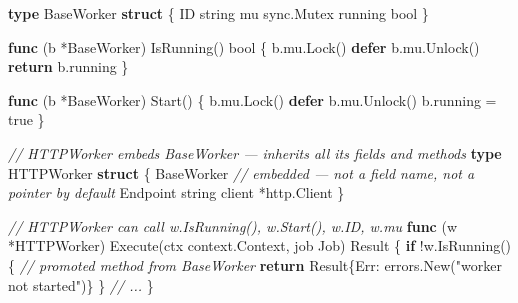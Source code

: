 \documentclass[
]{article}
\newenvironment{Shaded}{}{}
\newcommand{\CommentTok}[1]{\textcolor[rgb]{0.38,0.63,0.69}{\textit{#1}}}
\newcommand{\ControlFlowTok}[1]{\textcolor[rgb]{0.00,0.44,0.13}{\textbf{#1}}}
\newcommand{\DataTypeTok}[1]{\textcolor[rgb]{0.56,0.13,0.00}{#1}}
\newcommand{\KeywordTok}[1]{\textcolor[rgb]{0.00,0.44,0.13}{\textbf{#1}}}
\newcommand{\NormalTok}[1]{#1}
\newcommand{\OperatorTok}[1]{\textcolor[rgb]{0.40,0.40,0.40}{#1}}
\newcommand{\OtherTok}[1]{\textcolor[rgb]{0.00,0.44,0.13}{#1}}
\newcommand{\StringTok}[1]{\textcolor[rgb]{0.25,0.44,0.63}{#1}}
\begin{document}
\begin{Shaded}
\begin{Highlighting}[]
\KeywordTok{type}\NormalTok{ BaseWorker }\KeywordTok{struct} \OperatorTok{\{}
\NormalTok{    ID      }\DataTypeTok{string}
\NormalTok{    mu      sync}\OperatorTok{.}\NormalTok{Mutex}
\NormalTok{    running }\DataTypeTok{bool}
\OperatorTok{\}}

\KeywordTok{func} \OperatorTok{(}\NormalTok{b }\OperatorTok{*}\NormalTok{BaseWorker}\OperatorTok{)}\NormalTok{ IsRunning}\OperatorTok{()} \DataTypeTok{bool} \OperatorTok{\{}
\NormalTok{    b}\OperatorTok{.}\NormalTok{mu}\OperatorTok{.}\NormalTok{Lock}\OperatorTok{()}
    \ControlFlowTok{defer}\NormalTok{ b}\OperatorTok{.}\NormalTok{mu}\OperatorTok{.}\NormalTok{Unlock}\OperatorTok{()}
    \ControlFlowTok{return}\NormalTok{ b}\OperatorTok{.}\NormalTok{running}
\OperatorTok{\}}

\KeywordTok{func} \OperatorTok{(}\NormalTok{b }\OperatorTok{*}\NormalTok{BaseWorker}\OperatorTok{)}\NormalTok{ Start}\OperatorTok{()} \OperatorTok{\{}
\NormalTok{    b}\OperatorTok{.}\NormalTok{mu}\OperatorTok{.}\NormalTok{Lock}\OperatorTok{()}
    \ControlFlowTok{defer}\NormalTok{ b}\OperatorTok{.}\NormalTok{mu}\OperatorTok{.}\NormalTok{Unlock}\OperatorTok{()}
\NormalTok{    b}\OperatorTok{.}\NormalTok{running }\OperatorTok{=} \OtherTok{true}
\OperatorTok{\}}

\CommentTok{// HTTPWorker embeds BaseWorker — inherits all its fields and methods}
\KeywordTok{type}\NormalTok{ HTTPWorker }\KeywordTok{struct} \OperatorTok{\{}
\NormalTok{    BaseWorker           }\CommentTok{// embedded — not a field name, not a pointer by default}
\NormalTok{    Endpoint }\DataTypeTok{string}
\NormalTok{    client   }\OperatorTok{*}\NormalTok{http}\OperatorTok{.}\NormalTok{Client}
\OperatorTok{\}}

\CommentTok{// HTTPWorker can call w.IsRunning(), w.Start(), w.ID, w.mu}
\KeywordTok{func} \OperatorTok{(}\NormalTok{w }\OperatorTok{*}\NormalTok{HTTPWorker}\OperatorTok{)}\NormalTok{ Execute}\OperatorTok{(}\NormalTok{ctx context}\OperatorTok{.}\NormalTok{Context}\OperatorTok{,}\NormalTok{ job Job}\OperatorTok{)}\NormalTok{ Result }\OperatorTok{\{}
    \ControlFlowTok{if} \OperatorTok{!}\NormalTok{w}\OperatorTok{.}\NormalTok{IsRunning}\OperatorTok{()} \OperatorTok{\{}  \CommentTok{// promoted method from BaseWorker}
        \ControlFlowTok{return}\NormalTok{ Result}\OperatorTok{\{}\NormalTok{Err}\OperatorTok{:}\NormalTok{ errors}\OperatorTok{.}\NormalTok{New}\OperatorTok{(}\StringTok{"worker not started"}\OperatorTok{)\}}
    \OperatorTok{\}}
    \CommentTok{// ...}
\OperatorTok{\}}
\end{Highlighting}
\end{Shaded}
\end{document}
